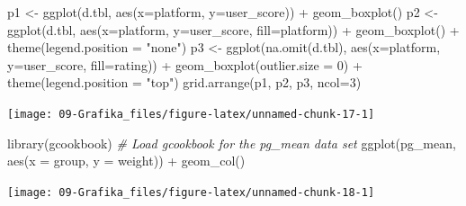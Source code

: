 \documentclass[
]{book}
\newenvironment{Shaded}{\begin{snugshade}}{\end{snugshade}}
\newcommand{\AttributeTok}[1]{\textcolor[rgb]{0.77,0.63,0.00}{#1}}
\newcommand{\CommentTok}[1]{\textcolor[rgb]{0.56,0.35,0.01}{\textit{#1}}}
\newcommand{\DecValTok}[1]{\textcolor[rgb]{0.00,0.00,0.81}{#1}}
\newcommand{\FunctionTok}[1]{\textcolor[rgb]{0.00,0.00,0.00}{#1}}
\newcommand{\NormalTok}[1]{#1}
\newcommand{\OtherTok}[1]{\textcolor[rgb]{0.56,0.35,0.01}{#1}}
\newcommand{\SpecialCharTok}[1]{\textcolor[rgb]{0.00,0.00,0.00}{#1}}
\newcommand{\StringTok}[1]{\textcolor[rgb]{0.31,0.60,0.02}{#1}}
\begin{document}
\begin{Shaded}
\begin{Highlighting}[]
\NormalTok{p1 }\OtherTok{\textless{}{-}} \FunctionTok{ggplot}\NormalTok{(d.tbl, }\FunctionTok{aes}\NormalTok{(}\AttributeTok{x=}\NormalTok{platform, }\AttributeTok{y=}\NormalTok{user\_score)) }\SpecialCharTok{+} \FunctionTok{geom\_boxplot}\NormalTok{()}
\NormalTok{p2 }\OtherTok{\textless{}{-}} \FunctionTok{ggplot}\NormalTok{(d.tbl, }\FunctionTok{aes}\NormalTok{(}\AttributeTok{x=}\NormalTok{platform, }\AttributeTok{y=}\NormalTok{user\_score, }\AttributeTok{fill=}\NormalTok{platform)) }\SpecialCharTok{+} \FunctionTok{geom\_boxplot}\NormalTok{() }\SpecialCharTok{+} \FunctionTok{theme}\NormalTok{(}\AttributeTok{legend.position =} \StringTok{"none"}\NormalTok{)}
\NormalTok{p3 }\OtherTok{\textless{}{-}} \FunctionTok{ggplot}\NormalTok{(}\FunctionTok{na.omit}\NormalTok{(d.tbl), }\FunctionTok{aes}\NormalTok{(}\AttributeTok{x=}\NormalTok{platform, }\AttributeTok{y=}\NormalTok{user\_score, }\AttributeTok{fill=}\NormalTok{rating)) }\SpecialCharTok{+} \FunctionTok{geom\_boxplot}\NormalTok{(}\AttributeTok{outlier.size =} \DecValTok{0}\NormalTok{) }\SpecialCharTok{+} \FunctionTok{theme}\NormalTok{(}\AttributeTok{legend.position =} \StringTok{"top"}\NormalTok{)}
\FunctionTok{grid.arrange}\NormalTok{(p1, p2, p3, }\AttributeTok{ncol=}\DecValTok{3}\NormalTok{)}
\end{Highlighting}
\end{Shaded}

\begin{center}\texttt{[image: 09-Grafika\_files/figure-latex/unnamed-chunk-17-1]} \end{center}

\begin{Shaded}
\begin{Highlighting}[]
\FunctionTok{library}\NormalTok{(gcookbook)  }\CommentTok{\# Load gcookbook for the pg\_mean data set}
\FunctionTok{ggplot}\NormalTok{(pg\_mean, }\FunctionTok{aes}\NormalTok{(}\AttributeTok{x =}\NormalTok{ group, }\AttributeTok{y =}\NormalTok{ weight)) }\SpecialCharTok{+}
  \FunctionTok{geom\_col}\NormalTok{()}
\end{Highlighting}
\end{Shaded}

\begin{center}\texttt{[image: 09-Grafika\_files/figure-latex/unnamed-chunk-18-1]} \end{center}
\end{document}

